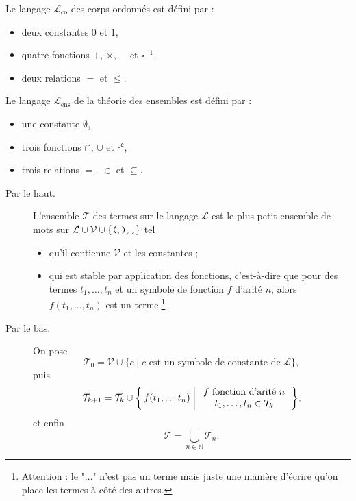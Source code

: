 \documentclass[./main]{subfiles}
\begin{document}
  \begin{exm}
    Le langage $\mathcal{L}_\mathrm{co}$ des corps ordonnés est défini par :
    \begin{itemize}
      \item deux constantes $0$ et $1$,
      \item quatre fonctions $+$, $\times$, $-$ et $\square^{-1}$,
      \item deux relations $=$ et $\le$.
    \end{itemize}
  \end{exm}

  \begin{exm}
    Le langage $\mathcal{L}_\mathrm{ens}$ de la théorie des ensembles est défini par :
    \begin{itemize}
      \item une constante $\emptyset$,
      \item trois fonctions $\cap$, $\cup$ et $\square^\mathsf{c}$,
      \item trois relations $=$, $\in$ et $\subseteq$.
    \end{itemize}
  \end{exm}

  \begin{defn}
    \begin{description}
      \item[Par le haut.]
        L'ensemble $\mathcal{T}$ des termes sur le langage $\mathcal{L}$ est le plus petit ensemble de mots sur $\mathcal{L} \cup \mathcal{V} \cup \{\verb|(|, \verb|)|, \verb|,|\}$ tel
        \begin{itemize}
          \item qu'il contienne $\mathcal{V}$ et les constantes ;
          \item qui est stable par application des fonctions, c'est-à-dire que pour des termes $t_1, \ldots, t_n$ et un symbole de fonction $f$ d'arité $n$, alors $f(t_1, \ldots, t_n)$ est un terme.\footnote{Attention : le "$\ldots$" n'est pas un terme mais juste une manière d'écrire qu'on place les termes à côté des autres.}
        \end{itemize}
      \item[Par le bas.]
        On pose \[
          \mathcal{T}_0 = \mathcal{V} \cup \{c  \mid c \text{ est un symbole de constante de } \mathcal{L} \} 
        ,\] 
        puis \[
        \mathcal{T}_{k+1} = \mathcal{T}_k \cup \mleft\{\,f(t_1, \ldots t_n) \;\middle|\;
        \begin{array}{c}
          f \text{ fonction d'arité } n\\
          t_1, \ldots, t_n \in \mathcal{T}_k
        \end{array}\,\mright\}  
        ,\] et enfin \[
        \mathcal{T} = \bigcup_{n \in \mathds{N}} \mathcal{T}_n
        .\]
    \end{description}
  \end{defn}
\end{document}
